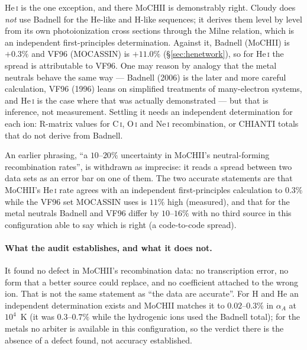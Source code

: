 \documentclass[english,a4paper]{my_memo}
\begin{document}
He\,\textsc{i} is the one exception, and there MoCHII is demonstrably right.
Cloudy does \emph{not} use Badnell for the He-like and H-like sequences; it
derives them level by level from its own photoionization cross sections through
the Milne relation, which is an independent first-principles determination.
Against it, Badnell (MoCHII) is $+0.3\%$ and VF96 (MOCASSIN) is $+11.0\%$
(\S\ref{sec:henetwork}), so for He\,\textsc{i} the spread is attributable to
VF96.  One may reason by analogy that the metal neutrals behave the same way
--- Badnell (2006) is the later and more careful calculation, VF96 (1996) leans
on simplified treatments of many-electron systems, and He\,\textsc{i} is the
case where that was actually demonstrated --- but that is inference, not
measurement.  Settling it needs an independent determination for each ion:
R-matrix values for C\,\textsc{i}, O\,\textsc{i} and Ne\,\textsc{i}
recombination, or CHIANTI totals that do not derive from Badnell.

An earlier phrasing, ``a $10$--$20\%$ uncertainty in MoCHII's
neutral-forming recombination rates'', is withdrawn as imprecise: it reads a
spread between two data sets as an error bar on one of them.  The two accurate
statements are that MoCHII's He\,\textsc{i} rate agrees with an independent
first-principles calculation to $0.3\%$ while the VF96 set MOCASSIN uses is
$11\%$ high (measured), and that for the metal neutrals Badnell and VF96 differ
by $10$--$16\%$ with no third source in this configuration able to say which is
right (a code-to-code spread).

\paragraph{What the audit establishes, and what it does not.}  It found no
defect in MoCHII's recombination data: no transcription error, no form that a
better source could replace, and no coefficient attached to the wrong ion.
That is not the same statement as ``the data are accurate''.  For H and He an
independent determination exists and MoCHII matches it to $0.02$--$0.3\%$ in $\alpha_A$ at $10^4$~K (it was $0.3$--$0.7\%$ while the hydrogenic ions used the Badnell total); for
the metals no arbiter is available in this configuration, so the verdict there
is the absence of a defect found, not accuracy established.
\end{document}
